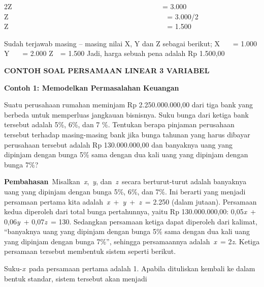 \documentclass[11pt,fleqn]{book} %
\begin{document}
\begin{myEnumerate}
\begin{itemize}
		2Z $  $~~~~~~~~~~~~~~~~~~~~~~~~~~~~~~~~~~~~~~~~~ = 3.000\vspace{\baselineskip}
		Z~~~~~~~~~~~~~~~~~~~~~~~~~~~~~~~~~~~~~~~~~~~~ = 3.000/2\vspace{\baselineskip}
		Z~~~~~~~~~~~~~~~~~~~~~~~~~~~~~~~~~~~~~~~~~~~~ = 1.500 \par
		\noindent 
		Sudah terjawab masing – masing nilai X, Y dan Z sebagai berikut;\vspace{\baselineskip}
		X~~~ = 1.000\vspace{\baselineskip}
		Y~~~ = 2.000\vspace{\baselineskip}
		Z  $  $ $  $ = 1.500\vspace{\baselineskip}
		Jadi, harga sebuah pena adalah Rp 1.500,00 \par
		\vspace{12pt}
		\vspace{12pt}
\noindent \textbf{CONTOH SOAL PERSAMAAN LINEAR 3 VARIABEL}

\noindent \textbf{}

\noindent \textbf{Contoh 1: Memodelkan Permasalahan Keuangan}

\noindent Suatu perusahaan rumahan meminjam Rp 2.250.000.000,00 dari tiga bank yang berbeda untuk memperluas jangkauan bisnisnya. Suku bunga dari ketiga bank tersebut adalah 5\%, 6\%, dan 7 \%. Tentukan berapa pinjaman perusahaan tersebut terhadap masing-masing bank jika bunga tahunan yang harus dibayar perusahaan tersebut adalah Rp 130.000.000,00 dan banyaknya uang yang dipinjam dengan bunga 5\% sama dengan dua kali uang yang dipinjam dengan bunga 7\%?

\noindent \textbf{}

\noindent \textbf{Pembahasan}~Misalkan~\textit{x},~\textit{y}, dan~\textit{z}~secara berturut-turut adalah banyaknya uang yang dipinjam dengan bunga 5\%, 6\%, dan 7\%. Ini berarti yang menjadi persamaan pertama kita adalah~\textit{x}~+~\textit{y}~+~\textit{z}~= 2.250 (dalam jutaan). Persamaan kedua diperoleh dari total bunga pertahunnya, yaitu Rp 130.000.000,00: 0,05\textit{x}~+ 0,06\textit{y}~+ 0,07\textit{z}~= 130. Sedangkan persamaan ketiga dapat diperoleh dari kalimat, ``banyaknya uang yang dipinjam dengan bunga 5\% sama dengan dua kali uang yang dipinjam dengan bunga 7\%'', sehingga persamaannya adalah~\textit{x}~= 2\textit{z}. Ketiga persamaan tersebut membentuk sistem seperti berikut.

\noindent 

\noindent 

\noindent Suku-\textit{x}~pada persamaan pertama adalah 1. Apabila dituliskan kembali ke dalam bentuk standar, sistem tersebut akan menjadi


\end{itemize}
\end{myEnumerate}
\end{document}
